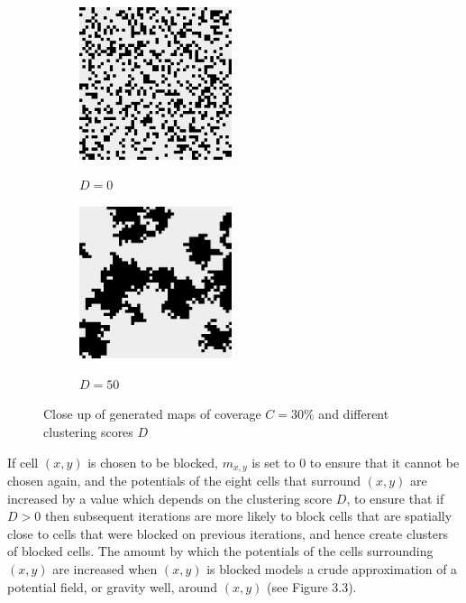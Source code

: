 \documentclass[12pt,notitlepage]{report}
\begin{document}
\begin{figure}
\centering
  \begin{subfigure}{.49\textwidth}
  \centering
  {\includegraphics[width=0.49\textwidth]{clustering0_.png}}
  \caption{$D=0$}
  \end{subfigure}
  \begin{subfigure}{.49\textwidth}
  \centering
  {\includegraphics[width=0.49\textwidth]{clustering50_.png}}
  \caption{$D=50$}
  \end{subfigure}
  \caption[Close up of generated maps]{Close up of generated maps of coverage $C=30\%$ and different clustering scores $D$} 
\end{figure}

\noindent
If cell $(x,y)$ is chosen to be blocked, $m_{x,y}$ is set to $0$ to ensure that it cannot be chosen again, and the potentials of the eight cells that surround $(x,y)$ are increased by a value which depends on the clustering score $D$, to ensure that if $D > 0$ then subsequent iterations are more likely to block cells that are spatially close to cells that were blocked on previous iterations, and hence create clusters of blocked cells. The amount by which the potentials of the cells surrounding $(x,y)$ are increased when $(x,y)$ is blocked models a crude approximation of a potential field, or gravity well, around $(x,y)$ (see Figure 3.3).\\
\end{document}
